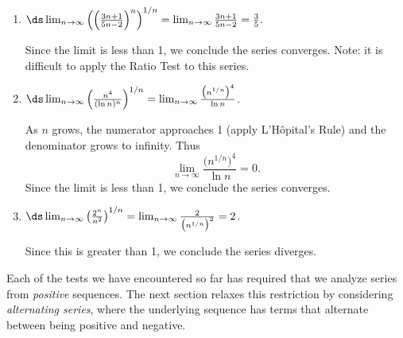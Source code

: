 {\begin{enumerate}
	\item $\ds\lim_{n\to\infty} \left(\left(\frac{3n+1}{5n-2}\right)^n\right)^{1/n} = \lim_{n\to\infty} \frac{3n+1}{5n-2} = \frac 35.$ 
	
	Since the limit is less than 1, we conclude the series converges. Note: it is difficult to apply the Ratio Test to this series.
	
	\item		$\ds\lim_{n\to\infty} \left(\frac{n^4}{(\ln n)^n}\right)^{1/n} = \lim_{n\to\infty} \frac {\big(n^{1/n}\big)^4}{\ln n}  $. 
	
	As $n$ grows, the numerator approaches 1 (apply L'H\^opital's Rule) and the denominator 
	grows to infinity.  Thus $$ \lim_{n\to\infty} \frac{\big(n^{1/n}\big)^4}{\ln n} = 0.$$ Since the limit is less than 1, we conclude the series converges.
	
	\item		$\ds \lim_{n\to\infty} \left(\frac{2^n}{n^2}\right)^{1/n} = \lim_{n\to\infty} \frac{2}{\big(n^{1/n}\big)^2} = 2$. 
	
	Since this is greater than 1, we conclude the series diverges.\eoehere
\end{enumerate}}


Each of the tests we have encountered so far has required that we analyze series from \emph{positive} sequences. The next section relaxes this restriction by  considering \emph{alternating series}, where the underlying sequence has terms that alternate between being positive and negative.

